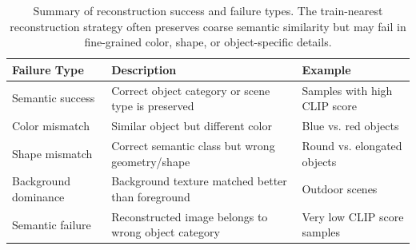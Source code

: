 \begin{table}[htbp]
\centering
\caption{Summary of reconstruction success and failure types. The train-nearest reconstruction strategy often preserves coarse semantic similarity but may fail in fine-grained color, shape, or object-specific details.}
\label{tab:recon_failure_types}
\begin{tabular}{lp{6cm}l}
\toprule
\textbf{Failure Type} & \textbf{Description} & \textbf{Example} \\
\midrule
Semantic success & Correct object category or scene type is preserved & Samples with high CLIP score \\
Color mismatch & Similar object but different color & Blue vs. red objects \\
Shape mismatch & Correct semantic class but wrong geometry/shape & Round vs. elongated objects \\
Background dominance & Background texture matched better than foreground & Outdoor scenes \\
Semantic failure & Reconstructed image belongs to wrong object category & Very low CLIP score samples \\
\bottomrule
\end{tabular}
\end{table}
